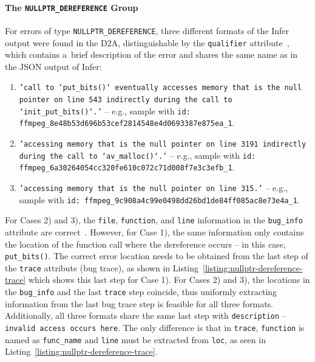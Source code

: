 \paragraph{The \texttt{NULLPTR\_DEREFERENCE} Group}
For errors of type \texttt{NULLPTR\_DEREFERENCE}, three different formats of the Infer output were found in the D2A, distinguishable by the \texttt{qualifier} attribute~\cite{d2a-sample-description}, which contains a~brief description of the error and shares the same name as in the JSON output of Infer:
\begin{enumerate}
    \item \texttt{'call to `put\_bits()` eventually accesses memory that is the null 
    \newline
    pointer on line 543 indirectly during the call to `init\_put\_bits()`.'}
    \newline
    -- e.g., sample with \texttt{id: ffmpeg\_8e48b53d696b53cef2814548e4d0693387e875ea\_1}.
    \item \texttt{'accessing memory that is the null pointer on line 3191 indirectly 
    \newline
    during the call to `av\_malloc()`.'} 
    \newline
    -- e.g., sample with \texttt{id: ffmpeg\_6a30264054cc320fe610c072c71d008f7e3c3efb\_1}.
    \item \texttt{'accessing memory that is the null pointer on line 315.'}
    \newline
    -- e.g., sample with \texttt{id: ffmpeg\_9c908a4c99e0498dd26bd1de84ff085ac8e73e4a\_1}.
\end{enumerate}

For Cases 2) and 3), the \texttt{file}, \texttt{function}, and \texttt{line} information in the \texttt{bug\_info} attribute are correct~\cite{d2a-sample-description}. However, for Case 1), the same information only contains the location of the function call where the dereference occurs -- in this case, \texttt{put\_bits()}. The correct error location needs to be obtained from the last step of the \texttt{trace} attribute (bug trace), as shown in Listing~\ref{listing:nullptr-dereference-trace} which shows this last step for Case 1). For Cases 2) and 3), the locations in the \texttt{bug\_info} and the last \texttt{trace} step coincide, thus uniformly extracting information from the last bug trace step is feasible for all three formats. Additionally, all three formats share the same last step with \texttt{description} -- \texttt{invalid access occurs here}. The only difference is that in \texttt{trace}, \texttt{function} is named as \texttt{func\_name} and \texttt{line} must be extracted from \texttt{loc}, as seen in Listing~\ref{listing:nullptr-dereference-trace}.

